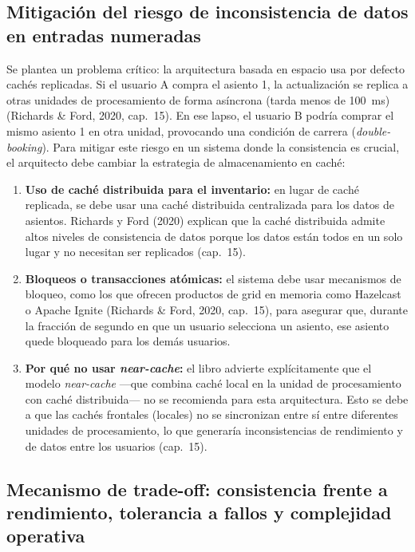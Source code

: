 \documentclass[12pt,a4paper]{article}
\begin{document}
\subsection{Mitigación del riesgo de inconsistencia de datos en entradas numeradas}

Se plantea un problema crítico: la arquitectura basada en espacio usa por defecto cachés replicadas. Si el usuario A compra el asiento 1, la actualización se replica a otras unidades de procesamiento de forma asíncrona (tarda menos de 100~ms) (Richards \& Ford, 2020, cap.~15). En ese lapso, el usuario B podría comprar el mismo asiento 1 en otra unidad, provocando una condición de carrera (\emph{double-booking}). Para mitigar este riesgo en un sistema donde la consistencia es crucial, el arquitecto debe cambiar la estrategia de almacenamiento en caché:

\begin{enumerate}[label=\arabic*.,leftmargin=*]
  \item \textbf{Uso de caché distribuida para el inventario:} en lugar de caché replicada, se debe usar una caché distribuida centralizada para los datos de asientos. Richards y Ford (2020) explican que la caché distribuida admite altos niveles de consistencia de datos porque los datos están todos en un solo lugar y no necesitan ser replicados (cap.~15).
  \item \textbf{Bloqueos o transacciones atómicas:} el sistema debe usar mecanismos de bloqueo, como los que ofrecen productos de grid en memoria como Hazelcast o Apache Ignite (Richards \& Ford, 2020, cap.~15), para asegurar que, durante la fracción de segundo en que un usuario selecciona un asiento, ese asiento quede bloqueado para los demás usuarios.
  \item \textbf{Por qué no usar \emph{near-cache}:} el libro advierte explícitamente que el modelo \emph{near-cache} ---que combina caché local en la unidad de procesamiento con caché distribuida--- no se recomienda para esta arquitectura. Esto se debe a que las cachés frontales (locales) no se sincronizan entre sí entre diferentes unidades de procesamiento, lo que generaría inconsistencias de rendimiento y de datos entre los usuarios (cap.~15).
\end{enumerate}

\subsection{Mecanismo de trade-off: consistencia frente a rendimiento, tolerancia a fallos y complejidad operativa}
\end{document}
